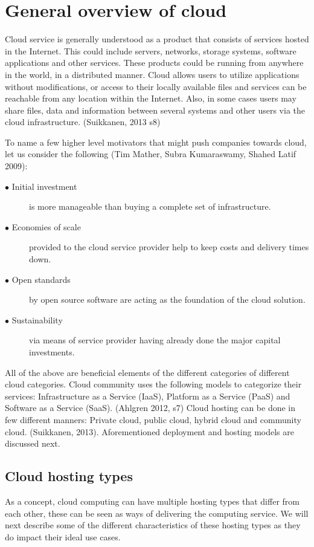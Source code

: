 \documentclass{article}
\begin{document}
\section{General overview of cloud}
Cloud service is generally understood as a product that consists of services hosted in the Internet. This could include servers, networks, storage systems, software applications and other services. These products could be running from anywhere in the world, in a distributed manner. Cloud allows users to utilize applications without modifications, or access to their locally available files and services can be reachable from any location within the Internet. Also, in some cases users may share files, data and information between several systems and other users via the cloud infrastructure.
(Suikkanen, 2013 s8)
\par
To name a few higher level motivators that might push companies towards cloud, let us consider the following (Tim Mather, Subra Kumaraswamy, Shahed Latif 2009):
\begin{description}
        \item[$\bullet$ Initial investment] is more manageable than buying a complete set of infrastructure.
        \item[$\bullet$ Economies of scale] provided to the cloud service provider help to keep costs and delivery times down.
        \item[$\bullet$ Open standards] by open source software are acting as the foundation of the cloud solution.
        \item[$\bullet$ Sustainability] via means of service provider having already done the major capital investments.
\end{description}
All of the above are beneficial elements of the different categories of different cloud categories.
Cloud community uses the following models to categorize their services: Infrastructure as a Service (IaaS), Platform as a Service (PaaS) and Software as a Service (SaaS). (Ahlgren 2012, s7)
Cloud hosting can be done in few different manners: Private cloud, public cloud, hybrid cloud and community cloud. (Suikkanen, 2013).
Aforementioned deployment and hosting models are discussed next.
\subsection{Cloud hosting types}
As a concept, cloud computing can have multiple hosting types that differ from each other, these can be seen as ways of delivering the computing service. We will next describe some of the different characteristics of these hosting types as they do impact their ideal use cases.
\end{document}
